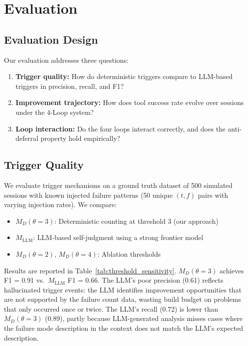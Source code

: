 \section{Evaluation}

\label{sec:evaluation}

\subsection{Evaluation Design}

Our evaluation addresses three questions:

\begin{enumerate}[leftmargin=1.5em]
    \item \textbf{Trigger quality:} How do deterministic triggers compare to
          LLM-based triggers in precision, recall, and F1?

    \item \textbf{Improvement trajectory:} How does tool success rate evolve
          over sessions under the 4-Loop system?

    \item \textbf{Loop interaction:} Do the four loops interact correctly, and
          does the anti-deferral property hold empirically?
\end{enumerate}

\subsection{Trigger Quality}

We evaluate trigger mechanisms on a ground truth dataset of 500 simulated
sessions with known injected failure patterns (50 unique $(t,f)$ pairs with
varying injection rates). We compare:

\begin{itemize}[leftmargin=1.5em]
    \item $M_D(\theta=3)$: Deterministic counting at threshold 3 (our approach)
    \item $M_{\text{LLM}}$: LLM-based self-judgment using a strong frontier model
    \item $M_D(\theta=2)$, $M_D(\theta=4)$: Ablation thresholds
\end{itemize}

Results are reported in Table~\ref{tab:threshold_sensitivity}.
$M_D(\theta=3)$ achieves F1 = 0.91 vs.\ $M_{\text{LLM}}$ F1 = 0.66.
The LLM's poor precision (0.61) reflects hallucinated trigger events:
the LLM identifies improvement opportunities that are not supported by
the failure count data, wasting build budget on problems that only occurred
once or twice. The LLM's recall (0.72) is lower than $M_D(\theta=3)$ (0.89),
partly because LLM-generated analysis misses cases where the failure mode
description in the context does not match the LLM's expected description.

